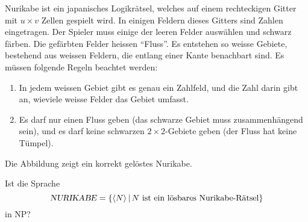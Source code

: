 Nurikabe ist ein japanisches Logikrätsel, welches auf einem rechteckigen
Gitter mit $u\times v$ Zellen gespielt wird. In einigen Feldern dieses Gitters
sind Zahlen eingetragen.
Der Spieler muss einige der leeren Felder auswählen und schwarz
färben. Die gefärbten Felder heissen ``Fluss''. Es entstehen so
weisse Gebiete, bestehend aus weissen Feldern, die entlang einer Kante
benachbart sind. Es müssen folgende Regeln beachtet werden:
\begin{enumerate}
\item In jedem weissen Gebiet gibt es genau ein Zahlfeld, und die Zahl darin
gibt an, wieviele weisse Felder das Gebiet umfasst.
\item Es darf nur einen Fluss geben (das schwarze Gebiet muss zusammenhängend
sein), und es darf keine schwarzen $2\times 2$-Gebiete geben (der Fluss hat
keine Tümpel).
\end{enumerate}
Die Abbildung zeigt ein korrekt gelöstes Nurikabe.
\begin{center}
\end{center}
Ist die Sprache
\[
\text{\textsl{NURIKABE}}=\{\langle N\rangle\,|\,\text{$N$ ist ein lösbares Nurikabe-Rätsel}\}
\]
in NP?


